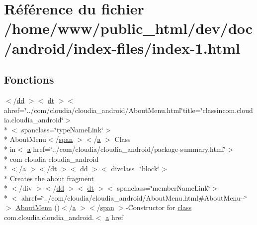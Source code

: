 \hypertarget{index-1_8html}{\section{Référence du fichier /home/www/public\-\_\-html/dev/doc/android/index-\/files/index-\/1.html}
\label{index-1_8html}
}
\subsection*{Fonctions}
\begin{DoxyCompactItemize}
\item 
$<$/\hyperlink{stylesheet_8css_a47f4718a86835a7771ec592ece845221}{dd} $>$$<$ \hyperlink{stylesheet_8css_a107565fb4039d33b041380d6e0ea1d80}{dt} $>$$<$ ahref=\char`\"{}../com/cloudia/cloudia\-\_\-android/About\-Menu.\-html\char`\"{}title=\char`\"{}classincom.\-cloudia.\-cloudia\-\_\-android\char`\"{}$>$\\*
$<$ spanclass=\char`\"{}type\-Name\-Link\char`\"{}$>$\\*
 About\-Menu$<$/\hyperlink{stylesheet_8css_a8343996ebcf16220b04e54659aac31cc}{span} $>$$<$/\hyperlink{style_8css_a5e8981582017bb8b84c21f148345d1f7}{a} $>$ Class \\*
in$<$ \hyperlink{style_8css_a5e8981582017bb8b84c21f148345d1f7}{a} href=\char`\"{}../com/cloudia/cloudia\-\_\-android/package-\/summary.\-html\char`\"{}$>$\\*
 com cloudia cloudia\-\_\-android\\*
$<$/\hyperlink{style_8css_a5e8981582017bb8b84c21f148345d1f7}{a} $>$$<$/\hyperlink{stylesheet_8css_a107565fb4039d33b041380d6e0ea1d80}{dt} $>$$<$ \hyperlink{stylesheet_8css_a47f4718a86835a7771ec592ece845221}{dd} $>$$<$ divclass=\char`\"{}block\char`\"{}$>$\\*
 Creates the about fragment\\*
$<$/div $>$$<$/\hyperlink{stylesheet_8css_a47f4718a86835a7771ec592ece845221}{dd} $>$$<$ \hyperlink{stylesheet_8css_a107565fb4039d33b041380d6e0ea1d80}{dt} $>$$<$ spanclass=\char`\"{}member\-Name\-Link\char`\"{}$>$\\*
$<$ ahref=\char`\"{}../com/cloudia/cloudia\-\_\-android/About\-Menu.\-html\#About\-Menu-\/-\/\char`\"{}$>$ \hyperlink{index-1_8html_a162bfbb70b33688ca3d6f9b372dd6e4b}{About\-Menu} ()$<$/\hyperlink{style_8css_a5e8981582017bb8b84c21f148345d1f7}{a} $>$$<$/\hyperlink{stylesheet_8css_a8343996ebcf16220b04e54659aac31cc}{span} $>$-\/Constructor for \hyperlink{_tools_8html_acf06f836132665ba8114f5a414c2403f}{class} com.\-cloudia.\-cloudia\-\_\-android.$<$ \hyperlink{style_8css_a5e8981582017bb8b84c21f148345d1f7}{a} href

\end{DoxyCompactItemize}
